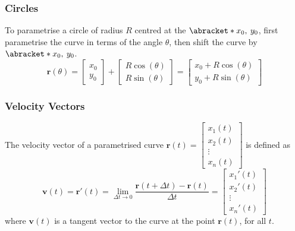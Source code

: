 \documentclass{article}
\begin{document}
\subsubsection{Circles}
To parametrise a circle of radius \(R\) centred at the
\(\abracket*{x_0,\: y_0}\), first parametrise the curve in terms of the
angle \(\theta\), then shift the curve by \(\abracket*{x_0,\: y_0}\).
\begin{equation*}
    \symbf{r}\left( \theta \right) =
    \begin{bmatrix}
        x_0 \\
        y_0
    \end{bmatrix}
    +
    \begin{bmatrix}
        R \cos{\left( \theta \right)} \\
        R \sin{\left( \theta \right)}
    \end{bmatrix}
    =
    \begin{bmatrix}
        x_0 + R \cos{\left( \theta \right)} \\
        y_0 + R \sin{\left( \theta \right)}
    \end{bmatrix}
\end{equation*}
\subsubsection{Velocity Vectors}
The velocity vector of a parametrised curve \(\symbf{r}\left( t \right)
=
\begin{bmatrix}
    x_1\left( t \right) \\
    x_2\left( t \right) \\
    \vdots              \\
    x_n\left( t \right)
\end{bmatrix}
\) is defined as
\begin{equation*}
    \symbf{v}\left( t \right) = \symbf{r}'\left( t \right) = \lim_{\Delta t \to 0} \frac{\symbf{r}\left( t + \Delta t \right) - \symbf{r}\left( t \right)}{\Delta t} =
    \begin{bmatrix}
        x_1'\left( t \right) \\
        x_2'\left( t \right) \\
        \vdots               \\
        x_n'\left( t \right)
    \end{bmatrix}
\end{equation*}
where \(\symbf{v}\left( t \right)\) is a tangent vector to the curve at the point \(\symbf{r}\left( t \right)\), for all \(t\).
\end{document}
